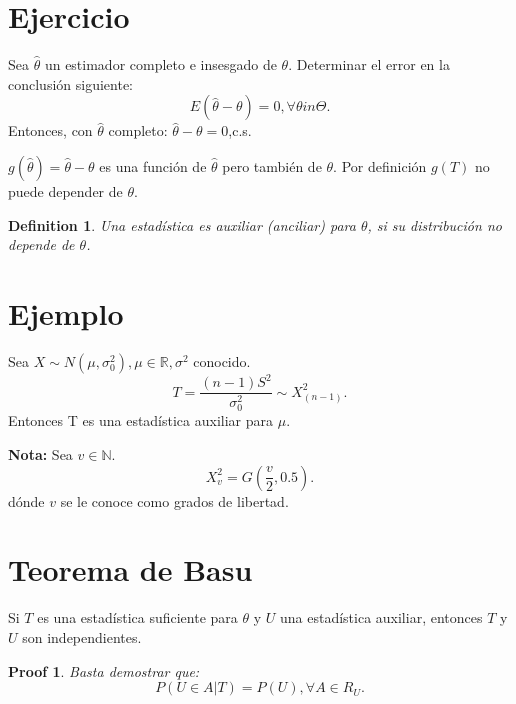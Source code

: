 \documentclass{article}
\newtheorem{mydef}{Definition}
\newtheorem{myprf}{Proof}
\begin{document}
\section{Ejercicio}
Sea $\hat{\theta}$ un estimador completo e insesgado de $\theta$. Determinar el error en la conclusión siguiente:
\[ E{(\hat{\theta}-\theta)}=0, \forall \theta in \Theta.\]
Entonces, con $\hat{\theta}$ completo: $\hat{\theta}-\theta=0$,c.s.

$g{(\hat{\theta})}=\hat{\theta}-\theta$ es una función de $\hat{\theta}$ pero también de $\theta$. Por definición $g{(T)}$ no puede depender de $\theta$.

\begin{mydef}
	Una estadística es auxiliar (anciliar) para $\theta$, si su distribución no depende de $\theta$.
\end{mydef}
\section{Ejemplo}

Sea $X  \sim N{(\mu,\sigma^{2}_{0})}, \mu \in \mathbb{R}, \sigma^{2}$ conocido.
\[ T=\frac{{(n-1)}S^{2}}{\sigma^{2}_{0}}\sim X^{2}_{{(n-1)}}.\]
Entonces T es una estadística auxiliar para $\mu$.

\textbf{Nota: } Sea $v \in \mathbb{N}$.
\[ X^{2}_{v}=G{(\frac{v}{2},0.5)}.\]
dónde $v$ se le conoce como grados de libertad.

\section{Teorema de Basu}
Si $T$ es una estadística suficiente para $\theta$ y $U$ una estadística auxiliar, entonces $T$ y $U$ son independientes.

\begin{myprf}
Basta demostrar que:
\[ P{(U \in A | T)}=P{(U)}, \forall A \in R_{U}.\]
\end{myprf}
\end{document}
